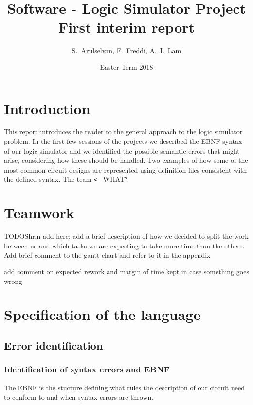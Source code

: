 \documentclass[a4paper,11pt]{article}
\numberwithin{equation}{section}
\begin{document}
	\title{%
		\textbf{Software - Logic Simulator Project
		} \\
		\Large First interim report\\
	}
	\date{Easter Term 2018}
	\author{S.~Arulselvan, F.~Freddi, A.~I.~Lam}
	\maketitle
	\thispagestyle{fancy}
	
	
	\lstset{aboveskip=\medskipamount}
	
	\section{Introduction}
This report introduces the reader to the general approach to the logic simulator problem. In the first few sessions of the projects we described the EBNF syntax of our logic simulator and we identified the possible semantic errors that might arise, considering how these should be handled. Two examples of how some of the most common circuit designs are represented using definition files consistent with the defined syntax. The team {\huge \verb|<-| WHAT?}

\section{Teamwork}
{\huge TODO}Shrin add here: add a brief description of how we decided to split the work between us and which tasks we are expecting to take more time than the others. Add brief comment to the gantt chart and refer to it in the appendix

add comment on expected rework and margin of time kept in case something goes wrong

\section{Specification of the language}
\subsection{Error identification}
\subsubsection{Identification of syntax errors and EBNF }
The EBNF is the stucture defining what rules the description of our circuit need to conform to and when syntax errors are thrown.
\end{document}
